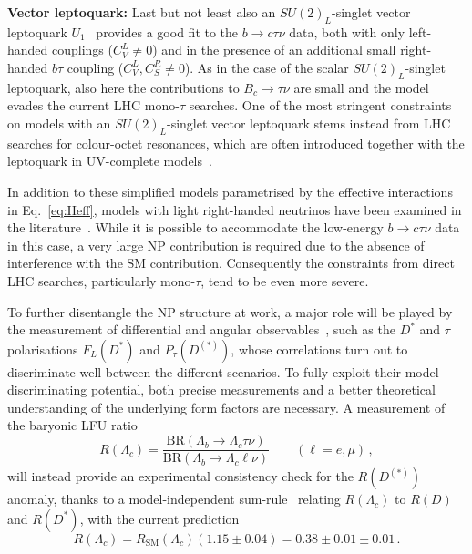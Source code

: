 \documentclass[10pt]{article}
\begin{document}
{\bf\boldmath Vector leptoquark:} Last but not least also an $SU(2)_L$-singlet vector leptoquark $U_1$~\cite{Alonso:2015sja,Calibbi:2015kma,Fajfer:2015ycq,Bordone:2017bld,DiLuzio:2017vat,Calibbi:2017qbu,Blanke:2018sro, BhupalDev:2020zcy} provides a good fit to the $b\to c\tau\nu$ data, both with only left-handed couplings ($C_V^L \ne 0$) and in the presence of an additional small right-handed $b\tau$ coupling ($C_V^L, C_S^R \ne 0$). As in the case of the scalar $SU(2)_L$-singlet leptoquark, also here the contributions to $B_c\to\tau\nu$ are small and the model evades the current LHC mono-$\tau$ searches. One of the most stringent constraints on models with an $SU(2)_L$-singlet vector leptoquark stems instead from LHC searches for colour-octet resonances, which are often introduced together with the leptoquark in UV-complete models~\cite{Buttazzo:2017ixm,Diaz:2017lit,Baker:2019sli}.

\begin{sloppypar}
In addition to these simplified models parametrised by the effective interactions in Eq.~\eqref{eq:Heff}, models with light right-handed neutrinos have been examined in the literature~\cite{Iguro:2018qzf,Greljo:2018ogz,Robinson:2018gza,Azatov:2018kzb,Mandal:2020htr}. While it is possible to accommodate the low-energy $b\to c\tau\nu$ data in this case, a very large NP contribution is required due to the absence of interference with the SM contribution. Consequently the constraints from direct LHC searches, particularly mono-$\tau$, tend to be even more severe.
\end{sloppypar}

To further disentangle the NP structure at work, a major role will be played by the measurement  of differential and angular observables~\cite{Nierste:2008qe,Becirevic:2016hea,Celis:2016azn,Iguro:2018vqb,Blanke:2018yud,Becirevic:2019tpx,Asadi:2020fdo}, such as the $D^*$ and $\tau$ polarisations $F_L(D^*)$ and $P_\tau (D^{(*)})$, whose correlations turn out to discriminate well between the different scenarios. To fully exploit their model-discriminating potential, both precise measurements and a better theoretical understanding of the underlying form factors are necessary. A measurement of the baryonic LFU ratio
\begin{equation}
R(\Lambda_c)=\frac{\text{BR}(\Lambda_b \to \Lambda_c \tau
  \nu)}{\text{BR}(\Lambda_b \to \Lambda_c \ell \nu)} \qquad (\ell=e,\mu)\,,
\end{equation}
will instead provide an experimental consistency check for the $R(D^{(*)})$ anomaly, thanks to a model-independent sum-rule~\cite{Blanke:2018yud} relating $R(\Lambda_c)$ to $R(D)$ and $R(D^*)$, with the current prediction~\cite{Blanke:2019qrx}
\begin{equation}
R(\Lambda_c) = R_\text{SM}(\Lambda_c)(1.15\pm 0.04)
=0.38\pm0.01\pm0.01\,.
\end{equation}
\end{document}
